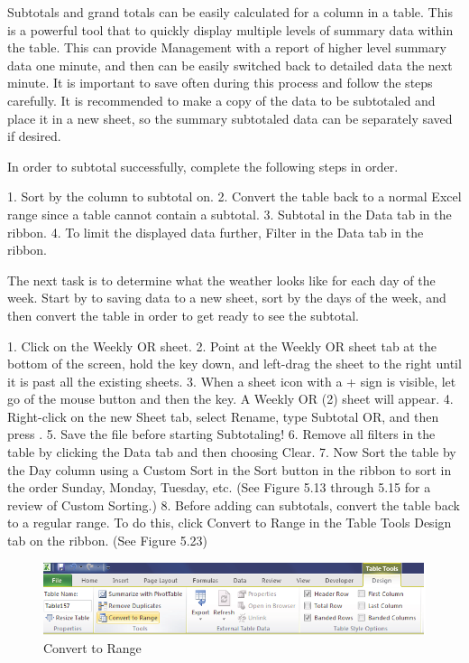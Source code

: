 Subtotals and grand totals can be easily calculated for a column in a table. This is a powerful tool that to quickly display multiple levels of summary data within the table. This can
provide Management with a report of higher level summary data one minute, and then can be easily
switched back to detailed data the next minute. It is important to save often during this process and
follow the steps carefully. It is recommended to make a copy of the data to be subtotaled and place it in a new sheet, so the summary subtotaled data can be separately saved if desired.

In order to subtotal successfully, complete the following steps in order.

1.   Sort by the column to subtotal on.
2.   Convert the table back to a normal Excel range since a table cannot contain a subtotal.
3.   Subtotal in the Data tab in the ribbon.
4.   To limit the displayed data further, Filter in the Data tab in the ribbon.

The next task is to determine what the weather looks like for each day of the week. Start by to saving data to a new sheet, sort by the days of the week, and then convert the table in order to get ready to see the subtotal.

1. Click on the Weekly OR sheet.
2. Point at the Weekly OR sheet tab at the bottom of the screen, hold the  key down, and left-drag the sheet to the right until it is past all the existing sheets.
3. When a sheet icon with a + sign is visible, let go of the mouse button and then the  key. A Weekly OR (2) sheet will appear.
4. Right-click on the new Sheet tab, select Rename, type Subtotal OR, and then press .
5. Save the file before starting Subtotaling!
6. Remove all filters in the table by clicking the Data tab and then choosing Clear.
7. Now Sort the table by the Day column using a Custom Sort in the Sort button in the ribbon to sort in the order Sunday, Monday, Tuesday, etc. (See Figure 5.13 through 5.15 for a review of Custom Sorting.)
8. Before adding can subtotals, convert the table back to a regular range. To do this, click Convert to Range in the Table Tools Design tab on the ribbon. (See Figure 5.23)


\begin{figure}[H]
	\centering
	\includegraphics[width=\maxwidth{.95\linewidth}]{gfx/ch05_fig23}
	\caption{Convert to Range}
	\label{05:fig23}
\end{figure}

